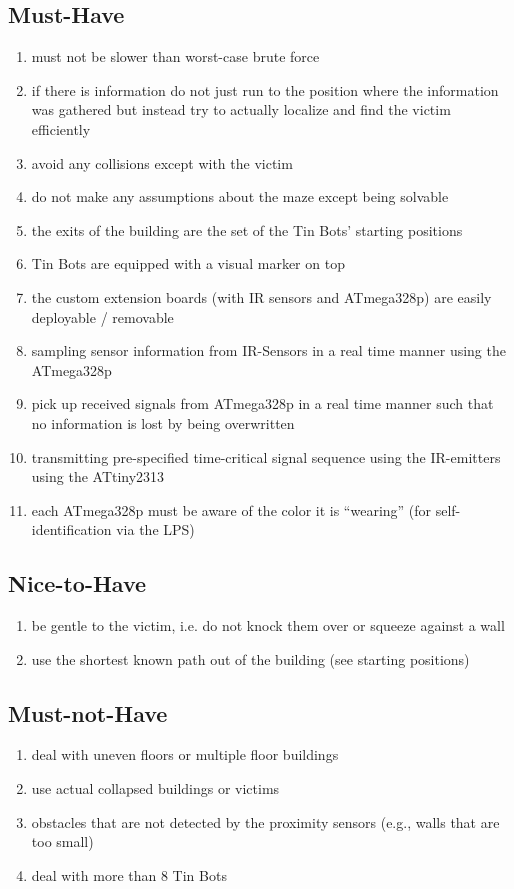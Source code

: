 \documentclass[a4paper,parskip,headheight=38pt]{scrartcl} %
\begin{document}
\subsection{Must-Have}
\begin{enumerate}[label=\musthave]
\item must not be slower than worst-case brute force
\item if there is information do not just run to the position where the information was gathered but instead try to actually localize and find the victim efficiently
\item avoid any collisions except with the victim
\item do not make any assumptions about the maze except being solvable
\item the exits of the building are the set of the Tin Bots' starting positions
\item Tin Bots are equipped with a visual marker on top
\item the custom extension boards (with IR sensors and ATmega328p) are easily deployable / removable
\item sampling sensor information from IR-Sensors in a real time manner using the ATmega328p 
\item pick up received signals from ATmega328p in a real time manner such that no information is lost by being overwritten
\item transmitting pre-specified time-critical signal sequence using the IR-emitters using the ATtiny2313
\item each ATmega328p must be aware of the color it is \enquote{wearing} (for self-identification via the LPS)
\end{enumerate}

\subsection{Nice-to-Have}
\begin{enumerate}[label=\nicetohave]
\item be gentle to the victim, i.e. do not knock them over or squeeze against a wall
\item use the shortest known path out of the building (see starting positions)
\end{enumerate}

\subsection{Must-not-Have}
\begin{enumerate}[label=\mustnothave]
\item deal with uneven floors or multiple floor buildings
\item use actual collapsed buildings or victims
\item obstacles that are not detected by the proximity sensors (e.g., walls that are too small)
\item deal with more than 8 Tin Bots
\end{enumerate}
\end{document}
